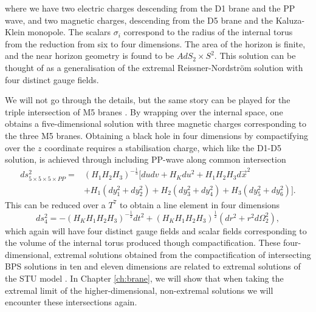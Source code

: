 where we have two electric charges descending from the D1 brane and the PP wave, and two magnetic charges, descending from the D5 brane and the Kaluza-Klein monopole. The scalars $\sigma_i$ correspond to the radius of the internal torus from the reduction from six to four dimensions. The area of the horizon is finite, and the near horizon geometry is found to be $AdS_2 \times S^2$. This  solution can be thought of as a generalisation of the extremal Reissner-Nordstr\"om solution with four distinct gauge fields. 

We will not go through the details, but the same story can be played for the triple intersection of M5 branes . By wrapping over the internal space, one obtains a five-dimensional solution with three magnetic charges corresponding to the three M5 branes. Obtaining a black hole in four dimensions by compactifying over the $z$ coordinate requires a stabilisation charge, which like the D1-D5 solution, is achieved through including PP-wave along common intersection \cite{Tseytlin:1996bh}
\begin{equation}
\begin{aligned}
    ds_{5 \times 5 \times 5 \times PP}^2 = &(H_1 H_2 H_3)^{-\frac{1}{3}} \big[ du dv + H_K du^2 + H_1 H_2 H_3 d\vec{x}^{2} \\
    &+ H_1(dy_1^2 + dy_2^2) + H_2(dy_3^2 + dy_4^2) + H_3(dy_5^2 + dy_6^2) \big].
\end{aligned}
\end{equation}
This can be reduced over a $T^7$ to obtain a line element in four dimensions \cite{Behrndt:1996jn}
\begin{equation}
\label{eq:triplem5red}
	ds^2_4 = -\left(H_K H_1 H_2 H_3 \right)^{-\frac{1}{2}} dt^2 + \left(H_K H_1 H_2 H_3 \right)^{\frac{1}{2}} (dr^2 + r^2 d\Omega^2_2),
\end{equation}
which again will have four distinct gauge fields and scalar fields corresponding to the volume of the internal torus produced though compactification. These four-dimensional, extremal solutions obtained from the compactification of intersecting BPS solutions in ten and eleven dimensions are related to extremal solutions of the STU model \cite{Behrndt:1996jn}. In Chapter \ref{ch:brane}, we will show that when taking the extremal limit of the higher-dimensional, non-extremal solutions we will encounter these intersections again.
